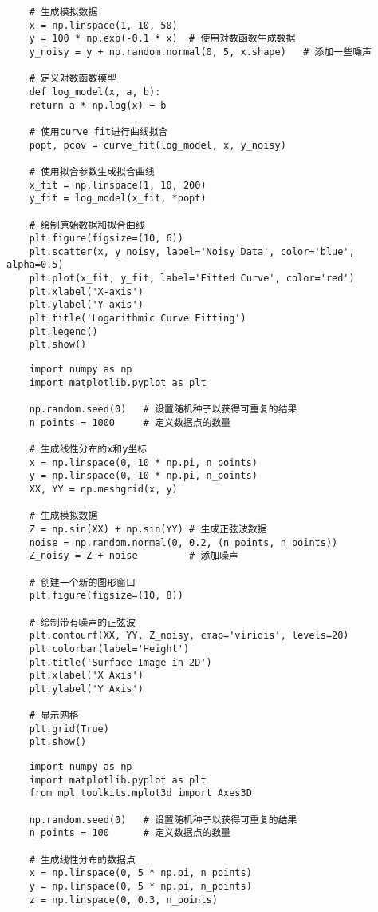 \documentclass{article}
\begin{document}
\begin{spacing}{1.5}
\begin{lstlisting}
	# 生成模拟数据
	x = np.linspace(1, 10, 50)
	y = 100 * np.exp(-0.1 * x)  # 使用对数函数生成数据
	y_noisy = y + np.random.normal(0, 5, x.shape)	# 添加一些噪声
	
	# 定义对数函数模型
	def log_model(x, a, b):
	return a * np.log(x) + b
	
	# 使用curve_fit进行曲线拟合
	popt, pcov = curve_fit(log_model, x, y_noisy)
	
	# 使用拟合参数生成拟合曲线
	x_fit = np.linspace(1, 10, 200)
	y_fit = log_model(x_fit, *popt)
	
	# 绘制原始数据和拟合曲线
	plt.figure(figsize=(10, 6))
	plt.scatter(x, y_noisy, label='Noisy Data', color='blue', alpha=0.5)
	plt.plot(x_fit, y_fit, label='Fitted Curve', color='red')
	plt.xlabel('X-axis')
	plt.ylabel('Y-axis')
	plt.title('Logarithmic Curve Fitting')
	plt.legend()
	plt.show()
\end{lstlisting}

\clearpage
{}
\begin{lstlisting}
	import numpy as np
	import matplotlib.pyplot as plt
	
	np.random.seed(0)	# 设置随机种子以获得可重复的结果
	n_points = 1000		# 定义数据点的数量
	
	# 生成线性分布的x和y坐标
	x = np.linspace(0, 10 * np.pi, n_points)
	y = np.linspace(0, 10 * np.pi, n_points)
	XX, YY = np.meshgrid(x, y)
	
	# 生成模拟数据
	Z = np.sin(XX) + np.sin(YY)	# 生成正弦波数据
	noise = np.random.normal(0, 0.2, (n_points, n_points))
	Z_noisy = Z + noise			# 添加噪声
	
	# 创建一个新的图形窗口
	plt.figure(figsize=(10, 8))
	
	# 绘制带有噪声的正弦波
	plt.contourf(XX, YY, Z_noisy, cmap='viridis', levels=20)
	plt.colorbar(label='Height')
	plt.title('Surface Image in 2D')
	plt.xlabel('X Axis')
	plt.ylabel('Y Axis')
	
	# 显示网格
	plt.grid(True)
	plt.show()
\end{lstlisting}


\clearpage
{}
\begin{lstlisting}
	import numpy as np
	import matplotlib.pyplot as plt
	from mpl_toolkits.mplot3d import Axes3D
	
	np.random.seed(0)	# 设置随机种子以获得可重复的结果
	n_points = 100		# 定义数据点的数量
	
	# 生成线性分布的数据点
	x = np.linspace(0, 5 * np.pi, n_points)
	y = np.linspace(0, 5 * np.pi, n_points)
	z = np.linspace(0, 0.3, n_points)
	

\end{lstlisting}
\end{spacing}
\end{document}

